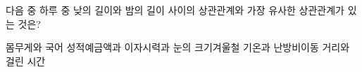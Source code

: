 다음 중 하루 중 낮의 길이와 밤의 길이 사이의 상관관계와 가장 유사한 상관관계가 있는 것은?
\begin{choicesv}{몸무게와 국어 성적}{예금액과 이자}{시력과 눈의 크기}{겨울철 기온과 난방비}{이동 거리와 걸린 시간}\end{choicesv}
